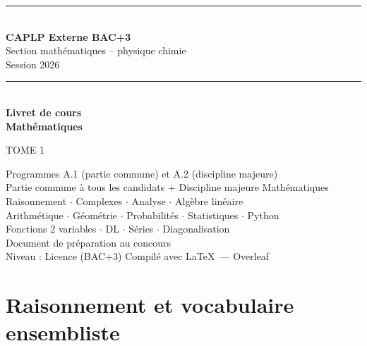 \documentclass[11pt,a4paper,twoside]{book}
\begin{document}
\begin{titlepage}
  \centering
  \vspace*{2cm}
  {\color{caplpblue}\rule{\linewidth}{1.5pt}}\\[0.4cm]
  {\Huge\bfseries\sffamily\color{caplpblue} CAPLP Externe BAC+3}\\[0.3cm]
  {\Large\sffamily Section mathématiques -- physique chimie}\\[0.2cm]
  {\large\sffamily Session 2026}\\[0.2cm]
  {\color{caplpblue}\rule{\linewidth}{1.5pt}}\\[1.2cm]
  {\Huge\bfseries\sffamily Livret de cours}\\[0.4cm]
  {\LARGE\bfseries\sffamily\color{caplppurple} Mathématiques}\\[0.3cm]
  \begin{tcolorbox}[colback=caplpbluebg, colframe=caplpblue, width=7cm,
    halign=center, fontupper=\Large\bfseries\sffamily\color{caplpblue}]
    TOME 1
  \end{tcolorbox}
  \vspace{0.4cm}
  {\large\sffamily Programmes A.1 (partie commune) et A.2 (discipline majeure)}\\[0.3cm]
  {\normalsize\sffamily\color{caplpgray} Partie commune à tous les candidats + Discipline majeure Mathématiques}\\[2cm]
  {\large\sffamily\color{caplpgray}
    Raisonnement $\cdot$ Complexes $\cdot$ Analyse $\cdot$ Algèbre linéaire\\
    Arithmétique $\cdot$ Géométrie $\cdot$ Probabilités $\cdot$ Statistiques $\cdot$ Python\\[0.3cm]
    Fonctions 2 variables $\cdot$ DL $\cdot$ Séries $\cdot$ Diagonalisation
  }\\[2.5cm]
  {\normalsize\sffamily\color{caplpgray}
    Document de préparation au concours\\
    Niveau : Licence (BAC+3)
  }
  \vfill
  {\small\sffamily\color{caplpgray} Compilé avec \LaTeX\ --- Overleaf}
\end{titlepage}

\tableofcontents
\newpage

\chapter{Raisonnement et vocabulaire ensembliste}
\end{document}
